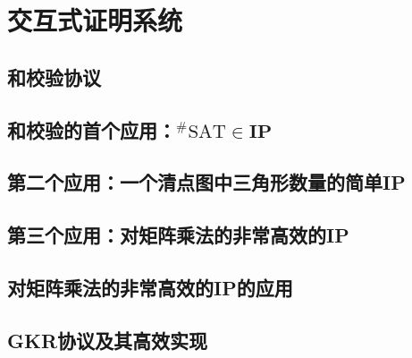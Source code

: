 \chapter{交互式证明系统}\label{chp:04IP}
\section{和校验协议}\label{4.1}
\section{和校验的首个应用：$^\# \mathrm{SAT} \in \mathbf{I P}$}\label{4.2}
\section{第二个应用：一个清点图中三角形数量的简单IP}\label{4.3}
\section{第三个应用：对矩阵乘法的非常高效的IP}\label{4.4}
\section{对矩阵乘法的非常高效的IP的应用}\label{4.5}
\section{GKR协议及其高效实现}\label{4.6}
